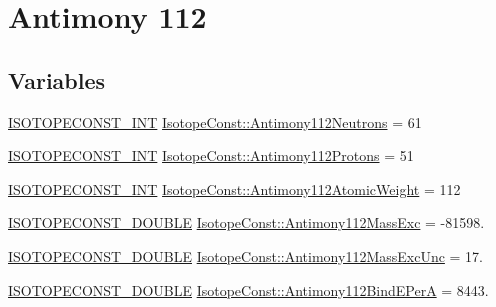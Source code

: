 \hypertarget{group___isotope_const-_antimony-_sb112}{}\section{Antimony 112}
\label{group___isotope_const-_antimony-_sb112}
\subsection*{Variables}
\begin{DoxyCompactItemize}
\item 
\mbox{\hyperlink{group___isotope_const-_macros_ga5f18360b3e99483a35c32d789e62621c}{I\+S\+O\+T\+O\+P\+E\+C\+O\+N\+S\+T\+\_\+\+I\+NT}} \mbox{\hyperlink{group___isotope_const-_antimony-_sb112_gaa47a37901b4a002004dde86e3854285a}{Isotope\+Const\+::\+Antimony112\+Neutrons}} = 61
\item 
\mbox{\hyperlink{group___isotope_const-_macros_ga5f18360b3e99483a35c32d789e62621c}{I\+S\+O\+T\+O\+P\+E\+C\+O\+N\+S\+T\+\_\+\+I\+NT}} \mbox{\hyperlink{group___isotope_const-_antimony-_sb112_gaf4ce1e22ad41f3583f9e4f03a2811568}{Isotope\+Const\+::\+Antimony112\+Protons}} = 51
\item 
\mbox{\hyperlink{group___isotope_const-_macros_ga5f18360b3e99483a35c32d789e62621c}{I\+S\+O\+T\+O\+P\+E\+C\+O\+N\+S\+T\+\_\+\+I\+NT}} \mbox{\hyperlink{group___isotope_const-_antimony-_sb112_ga5553d5191515ff9a7453662fa21ea478}{Isotope\+Const\+::\+Antimony112\+Atomic\+Weight}} = 112
\item 
\mbox{\hyperlink{group___isotope_const-_macros_ga8f45a7272ce02c0b4c65c44636ed719a}{I\+S\+O\+T\+O\+P\+E\+C\+O\+N\+S\+T\+\_\+\+D\+O\+U\+B\+LE}} \mbox{\hyperlink{group___isotope_const-_antimony-_sb112_ga76be430b98f7592f60d03f25cf4275d7}{Isotope\+Const\+::\+Antimony112\+Mass\+Exc}} = -\/81598.
\item 
\mbox{\hyperlink{group___isotope_const-_macros_ga8f45a7272ce02c0b4c65c44636ed719a}{I\+S\+O\+T\+O\+P\+E\+C\+O\+N\+S\+T\+\_\+\+D\+O\+U\+B\+LE}} \mbox{\hyperlink{group___isotope_const-_antimony-_sb112_ga570967ef9d3c386ab05ded342ca3af3f}{Isotope\+Const\+::\+Antimony112\+Mass\+Exc\+Unc}} = 17.
\item 
\mbox{\hyperlink{group___isotope_const-_macros_ga8f45a7272ce02c0b4c65c44636ed719a}{I\+S\+O\+T\+O\+P\+E\+C\+O\+N\+S\+T\+\_\+\+D\+O\+U\+B\+LE}} \mbox{\hyperlink{group___isotope_const-_antimony-_sb112_ga3c1a9ffb8b69930256b1357cae9bf9eb}{Isotope\+Const\+::\+Antimony112\+Bind\+E\+PerA}} = 8443.
\item 

\end{DoxyCompactItemize}
